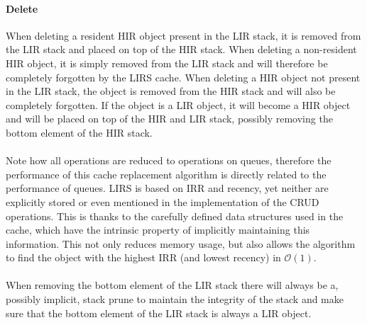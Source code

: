 \documentclass[pdftex,a4paper,12pt,twoside]{report}
\begin{document}
\paragraph{Delete} When deleting a resident HIR object present in the LIR stack, it is removed from the LIR stack and placed on top of the HIR stack. When deleting a non-resident HIR object, it is simply removed from the LIR stack and will therefore be completely forgotten by the LIRS cache. When deleting a HIR object not present in the LIR stack, the object is removed from the HIR stack and will also be completely forgotten. If the object is a LIR object, it will become a HIR object and will be placed on top of the HIR and LIR stack, possibly removing the bottom element of the HIR stack.
\\\\
Note how all operations are reduced to operations on queues, therefore the performance of this cache replacement algorithm is directly related to the performance of queues. LIRS is based on IRR and recency, yet neither are explicitly stored or even mentioned in the implementation of the CRUD operations. This is thanks to the carefully defined data structures used in the cache, which have the intrinsic property of implicitly maintaining this information. This not only reduces memory usage, but also allows the algorithm to find the object with the highest IRR (and lowest recency) in $\mathcal{O}(1)$.
\\\\
When removing the bottom element of the LIR stack there will always be a, possibly implicit, stack prune to maintain the integrity of the stack and make sure that the bottom element of the LIR stack is always a LIR object.
\end{document}
